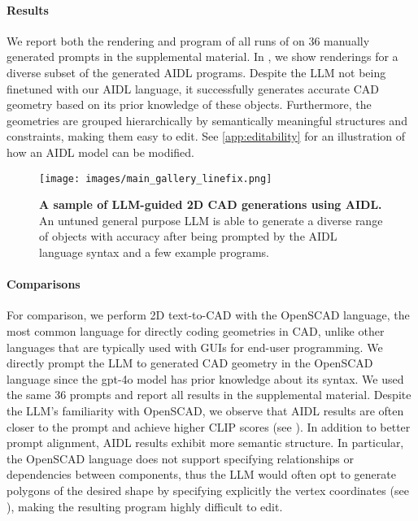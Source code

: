 

\paragraph{Results}
We report both the rendering and program of all runs of on 36 manually generated prompts in the supplemental material. In , we show renderings for a diverse subset of the generated AIDL programs. Despite the LLM not being finetuned with our AIDL language, it successfully generates accurate CAD geometry based on its prior knowledge of these objects. Furthermore, the geometries are grouped hierarchically by semantically meaningful structures and constraints, making them easy to edit. See \cref{app:editability} for an illustration of how an AIDL model can be modified. 


\begin{figure}[htbp!]
  \centering
  \texttt{[image: images/main\_gallery\_linefix.png]}
  \caption{\textbf{A sample of LLM-guided 2D CAD generations using AIDL.} An untuned general purpose LLM is able to generate a diverse range of objects with accuracy after being prompted by the AIDL language syntax and a few example programs.}
  \label{fig:Main result}
\end{figure}

\paragraph{Comparisons} For comparison, we perform 2D text-to-CAD with the OpenSCAD language, the most common language for directly coding geometries in CAD, unlike other languages that are typically used with GUIs for end-user programming. We directly prompt the LLM to generated CAD geometry in the OpenSCAD language since the gpt-4o model has prior knowledge about its syntax. We used the same 36 prompts and report all results in the supplemental material. Despite the LLM’s familiarity with OpenSCAD, we observe that AIDL results are often closer to the prompt and achieve higher CLIP scores (see ). In addition to better prompt alignment, AIDL results exhibit more semantic structure.  
In particular, the OpenSCAD language does not support specifying relationships or dependencies between components, thus the LLM would often opt to generate polygons of the desired shape by specifying explicitly the vertex coordinates (see ), making the resulting program highly difficult to edit. 

